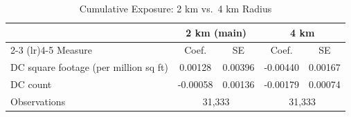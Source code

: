 \begin{table}[htbp]
\centering
\caption{Cumulative Exposure: 2 km vs.\ 4 km Radius}
\label{tab:appx_cumul_4km}
\small
\begin{tabular}{lcccc}
\toprule
& \multicolumn{2}{c}{2 km (main)} & \multicolumn{2}{c}{4 km} \\
\cmidrule(lr){2-3} \cmidrule(lr){4-5}
Measure & Coef. & SE & Coef. & SE \\
\midrule
DC square footage (per million sq ft) & 0.00128 & 0.00396 & -0.00440 & 0.00167 \\
DC count & -0.00058 & 0.00136 & -0.00179 & 0.00074 \\
Observations & \multicolumn{2}{c}{31,333} & \multicolumn{2}{c}{31,333} \\
\bottomrule
\end{tabular}
\end{table}
